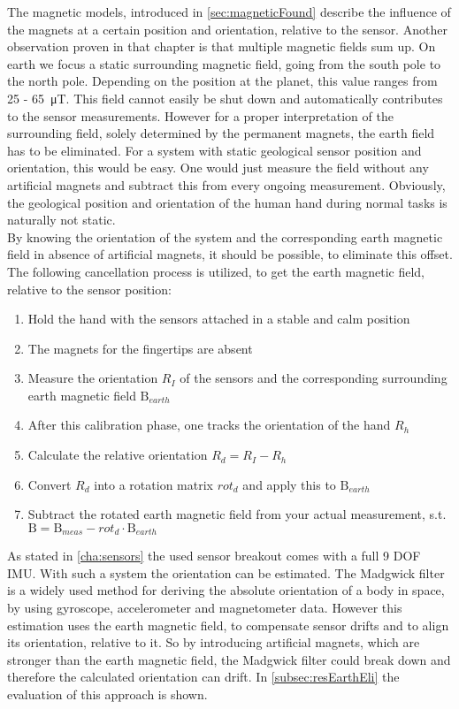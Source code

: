 The magnetic models, introduced in \ref{sec:magneticFound} describe the influence of the magnets at a certain position and orientation, relative to the sensor. Another observation proven in that chapter is that multiple magnetic fields sum up. On earth we focus a static surrounding magnetic field, going from the south pole to the north pole. Depending on the position at the planet, this value ranges from 25 - \SI{65}{\micro \tesla}. This field cannot easily be shut down and automatically contributes to the sensor measurements. However for a proper interpretation of the surrounding field, solely determined by the permanent magnets, the earth field has to be eliminated. For a system with static geological sensor position and orientation, this would be easy. One would just measure the field without any artificial magnets and subtract this from every ongoing measurement. Obviously, the geological position and orientation of the human hand during normal tasks is naturally not static.\\
By knowing the orientation of the system and the corresponding earth magnetic field in absence of artificial magnets, it should be possible, to eliminate this offset. The following cancellation process is utilized, to get the earth magnetic field, relative to the sensor position:\\
\begin{enumerate}
\item Hold the hand with the sensors attached in a stable and calm position
\item The magnets for the fingertips are absent
\item Measure the orientation $ R_{I} $ of the sensors and the corresponding surrounding earth magnetic field $ \mathrm{B}_{earth} $
\item After this calibration phase, one tracks the orientation of the hand $ R_{h} $
\item Calculate the relative orientation $ R_{d} = R_{I} - R_{h} $
\item Convert $ R_{d} $ into a rotation matrix $ rot_{d} $ and apply this to $ \mathrm{B}_{earth} $
\item Subtract the rotated earth magnetic field from your actual measurement, s.t. \\ $ \mathrm{B} = \mathrm{B}_{meas} - rot_{d} \cdot \mathrm{B}_{earth} $
\end{enumerate}
As stated in \ref{cha:sensors} the used sensor breakout comes with a full 9 \ac{DOF} \ac{IMU}. With such a system the orientation can be estimated. The Madgwick filter \cite{madgwick2010efficient} is a widely used method for deriving the absolute orientation of a body in space, by using gyroscope, accelerometer and magnetometer data. However this estimation uses the earth magnetic field, to compensate sensor drifts and to align its orientation, relative to it. So by introducing artificial magnets, which are stronger than the earth magnetic field, the Madgwick filter could break down and therefore the calculated orientation can drift. In \ref{subsec:resEarthEli} the evaluation of this approach is shown. 


